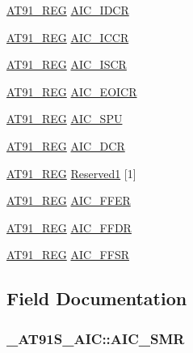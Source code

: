 \begin{CompactItemize}
\item 
\hyperlink{AT91SAM7X256_8h_712ad5a1ac1bd02f3e95a7526c283ce1}{AT91\_\-REG} \hyperlink{struct__AT91S__AIC_179b0425e4194dd6a0a2a44dfabc7d67}{AIC\_\-IDCR}
\item 
\hyperlink{AT91SAM7X256_8h_712ad5a1ac1bd02f3e95a7526c283ce1}{AT91\_\-REG} \hyperlink{struct__AT91S__AIC_8e7dbf14bb5c166df24bb1d014f1a5d0}{AIC\_\-ICCR}
\item 
\hyperlink{AT91SAM7X256_8h_712ad5a1ac1bd02f3e95a7526c283ce1}{AT91\_\-REG} \hyperlink{struct__AT91S__AIC_2784932bec9494dde08e3d63e821da50}{AIC\_\-ISCR}
\item 
\hyperlink{AT91SAM7X256_8h_712ad5a1ac1bd02f3e95a7526c283ce1}{AT91\_\-REG} \hyperlink{struct__AT91S__AIC_dbed024b2ed1aa309d77ed69db0cbcc9}{AIC\_\-EOICR}
\item 
\hyperlink{AT91SAM7X256_8h_712ad5a1ac1bd02f3e95a7526c283ce1}{AT91\_\-REG} \hyperlink{struct__AT91S__AIC_0e99c4c50663bf1ea7142e40d8e911e2}{AIC\_\-SPU}
\item 
\hyperlink{AT91SAM7X256_8h_712ad5a1ac1bd02f3e95a7526c283ce1}{AT91\_\-REG} \hyperlink{struct__AT91S__AIC_d50d494de6fc6381f1f98ca95019f2a4}{AIC\_\-DCR}
\item 
\hyperlink{AT91SAM7X256_8h_712ad5a1ac1bd02f3e95a7526c283ce1}{AT91\_\-REG} \hyperlink{struct__AT91S__AIC_2db6d3cdd632cfa69686b5186e47b9de}{Reserved1} \mbox{[}1\mbox{]}
\item 
\hyperlink{AT91SAM7X256_8h_712ad5a1ac1bd02f3e95a7526c283ce1}{AT91\_\-REG} \hyperlink{struct__AT91S__AIC_d0b62db4d5490f3f3868fc10e36d300c}{AIC\_\-FFER}
\item 
\hyperlink{AT91SAM7X256_8h_712ad5a1ac1bd02f3e95a7526c283ce1}{AT91\_\-REG} \hyperlink{struct__AT91S__AIC_f9790a9208a6ae1554938439df1872d3}{AIC\_\-FFDR}
\item 
\hyperlink{AT91SAM7X256_8h_712ad5a1ac1bd02f3e95a7526c283ce1}{AT91\_\-REG} \hyperlink{struct__AT91S__AIC_c3170bea6bdb66db30d2c0aea2d6e262}{AIC\_\-FFSR}
\end{CompactItemize}


\subsection{Field Documentation}
\hypertarget{struct__AT91S__AIC_8f67e50f87c9ec1296d138c8823956a9}{
\subsubsection{ {\bf \_\-AT91S\_\-AIC::AIC\_\-SMR}}}
\label{struct__AT91S__AIC_8f67e50f87c9ec1296d138c8823956a9}




